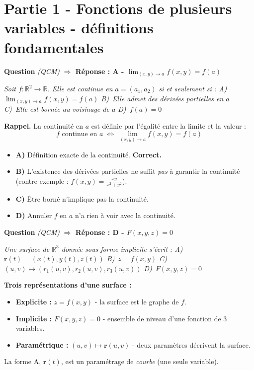 \documentclass[11pt,a4paper]{article}
\newcounter{qnum}
\newcommand{\qtitre}[2]{%
  \stepcounter{qnum}%
  \medskip\noindent
  \textbf{\color{bleutexte}Question \theqnum}\enspace
  \textit{(#1)}\enspace
  \textcolor{vertok}{\textbf{$\Rightarrow$ Réponse : #2}}
  \par\smallskip
}
\newcommand{\qenonce}[1]{%
  \begin{mdframed}[backgroundcolor=grisbox, linewidth=0pt,
    innerleftmargin=8pt, innerrightmargin=8pt,
    innertopmargin=5pt, innerbottommargin=5pt,
    skipabove=2pt, skipbelow=4pt]
  \small\textit{#1}
  \end{mdframed}
}
\begin{document}
\section{Partie 1 - Fonctions de plusieurs variables - définitions fondamentales}

\qtitre{QCM}{A - $\lim_{(x,y)\to a} f(x,y) = f(a)$}
\qenonce{Soit $f:\mathbb{R}^2\to\mathbb{R}$. Elle est continue en $a=(a_1,a_2)$ si et seulement si :
\quad A)~$\lim_{(x,y)\to a}f(x,y) = f(a)$
\quad B)~Elle admet des dérivées partielles en $a$
\quad C)~Elle est bornée au voisinage de $a$
\quad D)~$f(a) = 0$}

\begin{methodebox}
\textbf{Rappel.} La continuité en $a$ est définie par l'égalité entre la limite et la valeur :
$$f \text{ continue en } a \;\Longleftrightarrow\; \lim_{(x,y)\to a} f(x,y) = f(a)$$
\end{methodebox}

\begin{itemize}[leftmargin=1.5em, itemsep=2pt]
  \item \textcolor{vertok}{\textbf{A)}} Définition exacte de la continuité. \textbf{Correct.}
  \item \textcolor{rougeerr}{\textbf{B)}} L'existence des dérivées partielles ne suffit \emph{pas} à garantir la continuité (contre-exemple : $f(x,y)=\frac{xy}{x^2+y^2}$).
  \item \textcolor{rougeerr}{\textbf{C)}} Être borné n'implique pas la continuité.
  \item \textcolor{rougeerr}{\textbf{D)}} Annuler $f$ en $a$ n'a rien à voir avec la continuité.
\end{itemize}

\qtitre{QCM}{D - $F(x,y,z) = 0$}
\qenonce{Une surface de $\mathbb{R}^3$ donnée sous forme implicite s'écrit :
\quad A)~$\mathbf{r}(t) = (x(t),y(t),z(t))$
\quad B)~$z = f(x,y)$
\quad C)~$(u,v)\mapsto(r_1(u,v),r_2(u,v),r_3(u,v))$
\quad D)~$F(x,y,z) = 0$}

\begin{methodebox}
\textbf{Trois représentations d'une surface :}
\begin{itemize}[itemsep=1pt, topsep=2pt]
  \item \textbf{Explicite :} $z = f(x,y)$ - la surface est le graphe de $f$.
  \item \textbf{Implicite :} $F(x,y,z) = 0$ - ensemble de niveau d'une fonction de 3 variables.
  \item \textbf{Paramétrique :} $(u,v)\mapsto\mathbf{r}(u,v)$ - deux paramètres décrivent la surface.
\end{itemize}
La forme A, $\mathbf{r}(t)$, est un paramétrage de \emph{courbe} (une seule variable).
\end{methodebox}
\end{document}
